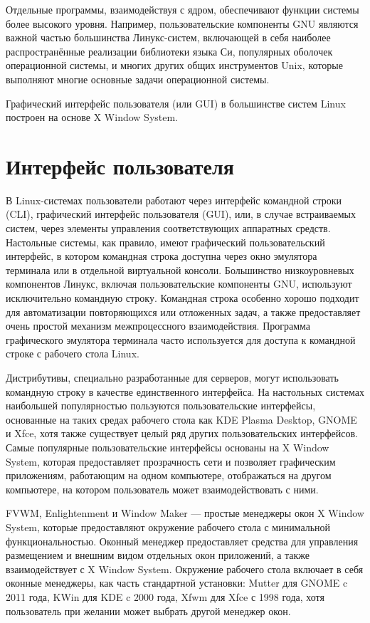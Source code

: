 Отдельные программы, взаимодействуя с ядром, обеспечивают функции системы более высокого уровня. Например, пользовательские компоненты GNU являются важной частью большинства Линукс-систем, включающей в себя наиболее распространённые реализации библиотеки языка Си, популярных оболочек операционной системы, и многих других общих инструментов Unix, которые выполняют многие основные задачи операционной системы.

Графический интерфейс пользователя (или GUI) в большинстве систем Linux построен на основе X Window System.
\newpage

\section*{Интерфейс пользователя}
В Linux-системах пользователи работают через интерфейс командной строки (CLI), графический интерфейс пользователя (GUI), или, в случае встраиваемых систем, через элементы управления соответствующих аппаратных средств. Настольные системы, как правило, имеют графический пользовательский интерфейс, в котором командная строка доступна через окно эмулятора терминала или в отдельной виртуальной консоли. Большинство низкоуровневых компонентов Линукс, включая пользовательские компоненты GNU, используют исключительно командную строку. Командная строка особенно хорошо подходит для автоматизации повторяющихся или отложенных задач, а также предоставляет очень простой механизм межпроцессного взаимодействия. Программа графического эмулятора терминала часто используется для доступа к командной строке с рабочего стола Linux.

Дистрибутивы, специально разработанные для серверов, могут использовать командную строку в качестве единственного интерфейса. На настольных системах наибольшей популярностью пользуются пользовательские интерфейсы, основанные на таких средах рабочего стола как KDE Plasma Desktop, GNOME и Xfce, хотя также существует целый ряд других пользовательских интерфейсов. Самые популярные пользовательские интерфейсы основаны на X Window System, которая предоставляет прозрачность сети и позволяет графическим приложениям, работающим на одном компьютере, отображаться на другом компьютере, на котором пользователь может взаимодействовать с ними.

FVWM, Enlightenment и Window Maker — простые менеджеры окон X Window System, которые предоставляют окружение рабочего стола с минимальной функциональностью. Оконный менеджер предоставляет средства для управления размещением и внешним видом отдельных окон приложений, а также взаимодействует с X Window System. Окружение рабочего стола включает в себя оконные менеджеры, как часть стандартной установки: Mutter для GNOME c 2011 года, KWin для KDE c 2000 года, Xfwm для Xfce с 1998 года, хотя пользователь при желании может выбрать другой менеджер окон.

